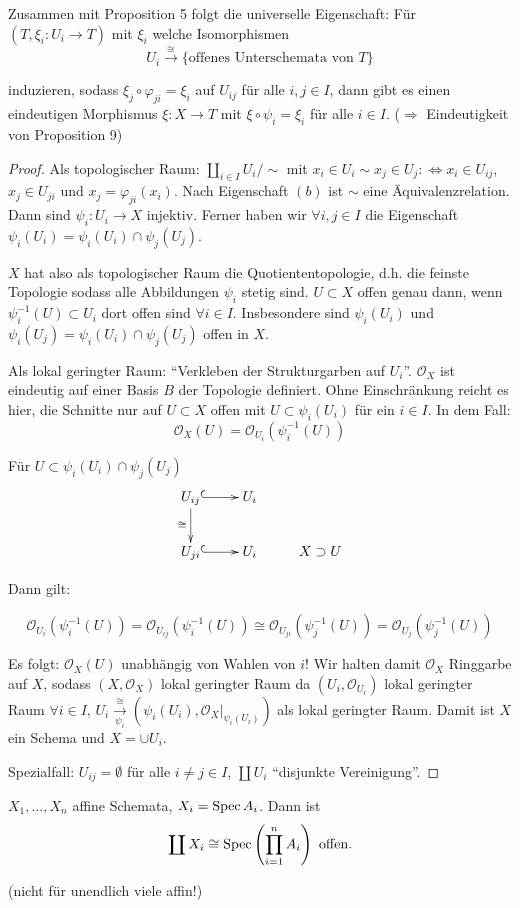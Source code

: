 Zusammen mit Proposition 5 folgt die universelle Eigenschaft: Für
$(T,\xi_{i}:U_{i}\rightarrow T)$ mit $\xi_{i}$ welche Isomorphismen
\[
  U_{i}\overset{\cong}{\rightarrow}\text{\{offenes Unterschemata von }T\}
\]

induzieren, sodass $\xi_{j}\circ\varphi_{ji}=\xi_{i}$ auf $U_{ij}$
für alle $i,j\in I$, dann gibt es einen eindeutigen Morphismus $\xi:X\rightarrow T$
mit $\xi\circ\psi_{i}=\xi_{i}$ für alle $i\in I$. ($\Longrightarrow$
Eindeutigkeit von Proposition 9)

\begin{proof}
Als topologischer Raum: $\coprod_{i\in I}U_{i}/\sim$ mit $x_{i}\in U_{i}\sim x_{j}\in U_{j}:\Leftrightarrow x_{i}\in U_{ij}$,
$x_{j}\in U_{ji}$ und $x_{j}=\varphi_{ji}(x_{i})$. Nach Eigenschaft
$(b)$ ist $\sim$ eine Äquivalenzrelation. Dann sind $\psi_{i}:U_{i}\rightarrow X$
injektiv. Ferner haben wir $\forall i,j\in I$ die Eigenschaft $\psi_{i}(U_{i})=\psi_{i}(U_{i})\cap\psi_{j}(U_{j})$.

$X$ hat also als topologischer Raum die Quotiententopologie, d.h.
die feinste Topologie sodass alle Abbildungen $\psi_{i}$ stetig sind.
$U\subset X$ offen genau dann, wenn $\psi_{i}^{-1}(U)\subset U_{i}$
dort offen sind $\forall i\in I$. Insbesondere sind $\psi_{i}(U_{i})$
und $\psi_{i}(U_{j})=\psi_{i}(U_{i})\cap\psi_{j}(U_{j})$ offen in
$X$.

Als lokal geringter Raum: ``Verkleben der Strukturgarben auf $U_{i}$''.
$\mathcal{O}_{X}$ ist eindeutig auf einer Basis $B$ der Topologie
definiert. Ohne Einschränkung reicht es hier, die Schnitte nur auf
$U\subset X$ offen mit $U\subset\psi_{i}(U_{i})$ für ein $i\in I$.
In dem Fall:
\[
  \mathcal{O}_{X}(U)=\mathcal{O}_{U_{i}}(\psi_{i}^{-1}(U))
\]

Für $U\subset\psi_{i}(U_{i})\cap\psi_{j}(U_{j})$
\[
  \xymatrix{U_{ij}\ar@{^{(}->}[r]\ar[d]_{\cong} & U_{i}\\
    U_{ji}\ar@{^{(}->}[r] & U_{i} & X\supset U
  }
\]

Dann gilt:

\[
  \mathcal{O}_{U_{i}}(\psi_{i}^{-1}(U))=\mathcal{O}_{U_{ij}}(\psi_{i}^{-1}(U))\cong\mathcal{O}_{U_{ji}}(\psi_{j}^{-1}(U))=\mathcal{O}_{U_{j}}(\psi_{j}^{-1}(U))
\]

Es folgt: $\mathcal{O}_{X}(U)$ unabhängig von Wahlen von $i$! Wir
halten damit $\mathcal{O}_{X}$ Ringgarbe auf $X$, sodass $(X,\mathcal{O}_{X})$
lokal geringter Raum da $(U_{i},\mathcal{O}_{U_{i}})$ lokal geringter
Raum $\forall i\in I$, $U_{i}\xrightarrow[\psi_{i}]{\cong}(\psi_{i}(U_{i}),\mathcal{O}_{X}|_{\psi_{i}(U_{i})})$
als lokal geringter Raum. Damit ist $X$ ein Schema und $X=\cup U_{i}$.

Spezialfall: $U_{ij}=\emptyset$ für alle $i\neq j\in I$, $\coprod U_{i}$
``disjunkte Vereinigung''.
\end{proof}
\begin{example}[10]
  $X_{1},\ldots,X_{n}$ affine Schemata, $X_{i}=\operatorname{Spec} A_{i}$. Dann
  ist
  \[
    \coprod X_{i}\cong\operatorname{Spec}\left(\prod_{i=1}^{n}A_{i}\right)\text{ offen}.
  \]

  (nicht für unendlich viele affin!)
\end{example}

